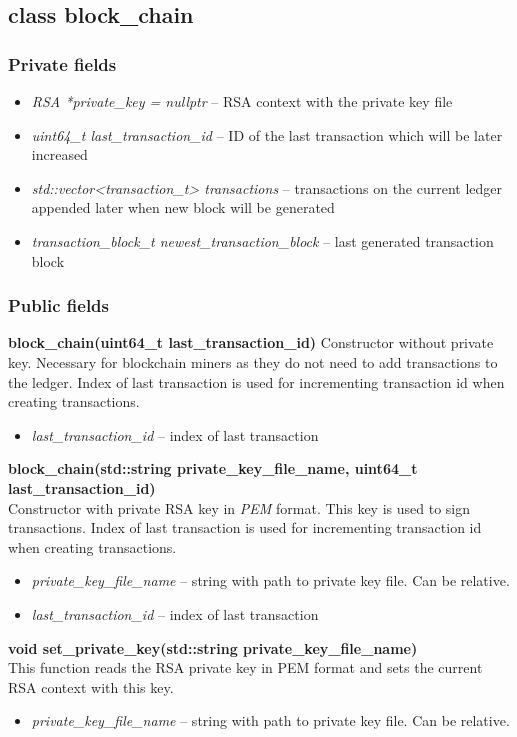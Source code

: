 \documentclass{article}
\begin{document}
\subsection{class block\_chain}
\subsubsection{Private fields}
\begin{itemize}
\item \textit{RSA *private\_key = nullptr} -- RSA context with the private key file
\item \textit{uint64\_t last\_transaction\_id} -- ID of the last transaction which will be later increased
\item \textit{std::vector<transaction\_t> transactions} -- transactions on the current ledger appended later when new block will be generated
\item \textit{transaction\_block\_t newest\_transaction\_block} -- last generated transaction block
\end{itemize}

\subsubsection{Public fields}
\textbf{block\_chain(uint64\_t last\_transaction\_id)}
Constructor without private key. Necessary for blockchain miners as they do not need to add transactions to the ledger. Index of last transaction is used for incrementing transaction id when creating transactions.
\begin{itemize}
\item \textit{last\_transaction\_id} -- index of last transaction
\end{itemize}

\textbf{block\_chain(std::string private\_key\_file\_name, uint64\_t last\_transaction\_id)} \\
Constructor with private RSA key in \textit{PEM} format. This key is used to sign transactions. Index of last transaction is used for incrementing transaction id when creating transactions.
\begin{itemize}
\item \textit{private\_key\_file\_name} -- string with path to private key file. Can be relative.
\item \textit{last\_transaction\_id} -- index of last transaction
\end{itemize}

\textbf{void set\_private\_key(std::string private\_key\_file\_name)} \\
This function reads the RSA private key in PEM format and sets the current RSA context with this key.
\begin{itemize}
\item \textit{private\_key\_file\_name} -- string with path to private key file. Can be relative.
\end{itemize}
\end{document}
